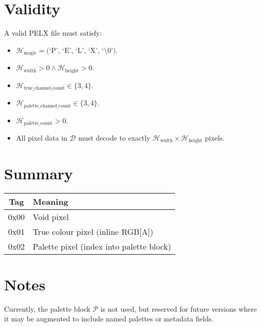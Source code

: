 \documentclass{article}
\begin{document}
\section{Validity}

A valid PELX file must satisfy:

\begin{itemize}
	\item $\mathcal{H}_{\text{magic}} = \text{(`P', `E', `L', `X', `\textbackslash0')}$.
	\item $\mathcal{H}_{\text{width}} > 0 \land \mathcal{H}_{\text{height}} > 0$.
	\item $\mathcal{H}_{\text{true\_channel\_count}} \in \{3, 4\}$.
	\item $\mathcal{H}_{\text{palette\_channel\_count}} \in \{3, 4\}$.
	\item $\mathcal{H}_{\text{palette\_count}} > 0$.
	\item All pixel data in $\mathcal{D}$ must decode to exactly $\mathcal{H}_{\text{width}} \times \mathcal{H}_{\text{height}}$ pixels.
\end{itemize}

\section{Summary}

\begin{center}
	\renewcommand{\arraystretch}{1.2}

	\begin{tabular}{|c|l|}
		\hline
			Tag & Meaning \\
		\hline
			0x00 & Void pixel \\
			0x01 & True colour pixel (inline RGB[A]) \\
			0x02 & Palette pixel (index into palette block) \\
		\hline
	\end{tabular}

\end{center}

\section{Notes}

Currently, the palette block $\mathcal{P}$ is not used, but reserved for future versions where it may be augmented to include named palettes or metadata fields.
\end{document}
